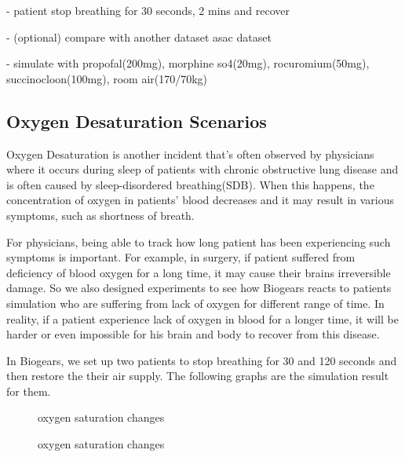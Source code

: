 \documentclass[a4paper]{article}
\begin{document}
- patient stop breathing for 30 seconds, 2 mins and recover

- (optional) compare with another dataset asac dataset

- simulate with propofal(200mg), morphine so4(20mg), rocuromium(50mg), succinocloon(100mg), room air(170/70kg)

\subsection{Oxygen Desaturation Scenarios}

Oxygen Desaturation is another incident that's often observed by physicians where it occurs during sleep of patients with chronic obstructive lung disease and is often caused by sleep-disordered breathing(SDB)\cite{low_oxygen_sleep}. When this happens, the concentration of oxygen in patients' blood decreases and it may result in various symptoms, such as shortness of breath.

For physicians, being able to track how long patient has been experiencing such symptoms is important. For example, in surgery, if patient suffered from deficiency of blood oxygen for a long time, it may cause their brains irreversible damage. So we also designed experiments to see how Biogears reacts to patients simulation who are suffering from lack of oxygen for different range of time. In reality, if a patient experience lack of oxygen in blood for a longer time, it will be harder or even impossible for his brain and body to recover from this disease.

In Biogears, we set up two patients to stop breathing for 30 and 120 seconds and then restore the their air supply. The following graphs are the simulation result for them.

\begin{figure}[!htb]\centering
   \begin{minipage}{0.49\textwidth}
     \caption{oxygen saturation changes}
     \label{fig:patient stoping breathing}
     
   \end{minipage}
   \begin {minipage}{0.49\textwidth}
     \caption{oxygen saturation changes}
     \label{fig:patient stoping breathing}
   \end{minipage}
\end{figure}
\end{document}
